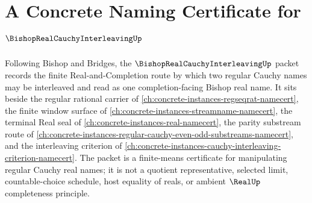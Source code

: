 \chapter{A Concrete Naming Certificate for $\BishopRealCauchyInterleavingUp$}
\label{ch:concrete-instances-bishop-real-cauchy-interleaving-namecert}

Following Bishop and Bridges, the $\BishopRealCauchyInterleavingUp$ packet records the finite Real-and-Completion route by which two regular Cauchy names may be interleaved and read as one completion-facing Bishop real name. It sits beside the regular rational carrier of \autoref{ch:concrete-instances-regseqrat-namecert}, the finite window surface of \autoref{ch:concrete-instances-streamname-namecert}, the terminal Real seal of \autoref{ch:concrete-instances-real-namecert}, the parity substream route of \autoref{ch:concrete-instances-regular-cauchy-even-odd-substreams-namecert}, and the interleaving criterion of \autoref{ch:concrete-instances-cauchy-interleaving-criterion-namecert}. The packet is a finite-means certificate for manipulating regular Cauchy real names; it is not a quotient representative, selected limit, countable-choice schedule, host equality of reals, or ambient $\RealUp$ completeness principle.

